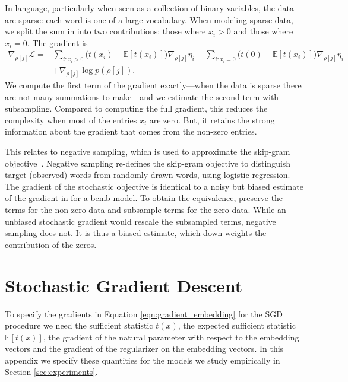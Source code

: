 \documentclass[12pt]{article}
\begin{document}
 In language, particularly
when seen as a collection of binary variables, the data are sparse:
each word is one of a large vocabulary. When modeling sparse data, we
split the sum in  into two contributions:
those where $x_{i}>0$ and those where $x_{i}=0$.  The gradient is
\begin{align}
  \nabla_{\rho[j]}\mathcal{L} = &
                                  \sum_{i: x_{i}>0}
                                  \big(t(x_{i})-\mathbb{E}[t(x_{i})]\big)
                                  \nabla_{\rho[j]}\eta_{i}
                                  +
                                  \sum_{i: x_{i}=0}
                                  \big(t(0) - \mathbb{E}[t(x_{i})]\big)
                                  \nabla_{\rho[j]}\eta_{i}
                                  \label{eqn:gradient_embedding_poisson} \\
                                & + \nabla_{\rho[j]} \log p(\rho[j]). \nonumber
\end{align}
We compute the first term of the gradient exactly---when the data is
sparse there are not many summations to make---and we estimate 
the second term with subsampling.  Compared to computing
the full gradient, this reduces the complexity when most of the
entries $x_{i}$ are zero.  But, it retains the strong information
about the gradient that comes from the non-zero entries.

This relates to negative sampling, which is used to approximate the
skip-gram objective~\citep{mikolov2013distributed}.  Negative sampling
re-defines the skip-gram objective to distinguish target (observed)
words from randomly drawn words, using logistic regression. The
gradient of the stochastic objective is identical to a noisy but
biased estimate of the gradient in
 for a \gls{bemb} model.  To
obtain the equivalence, preserve the terms for the non-zero data and
subsample terms for the zero data.  While an unbiased stochastic
gradient would rescale the subsampled terms, negative sampling does
not.  It is thus a biased estimate, which down-weights the
contribution of the zeros.


\section{Stochastic Gradient Descent}
\label{sec:sgd}
To specify the gradients in Equation \ref{eqn:gradient_embedding} for the \gls{SGD} procedure  we need the sufficient statistic $t(x)$, the expected sufficient statistic $\mathbb{E}[t(x)]$, the gradient of the natural parameter with respect to the embedding vectors and the gradient of the regularizer on the embedding vectors. In this appendix we specify these quantities for the models we study empirically in Section \ref{sec:experiments}.
\end{document}
